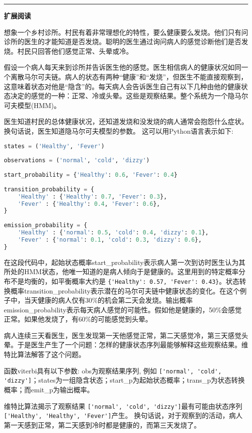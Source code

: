 \documentclass[11pt,a4paper,twoside]{book}
\begin{document}
\vspace{0.5cm}
\hrule height 3pt

\noindent
{\large \bfseries \HandPencilLeft 扩展阅读}

{\small
想象一个乡村诊所。村民有着非常理想化的特性，要么健康要么发烧。他们只有问诊所的医生的才能知道是否发烧。聪明的医生通过询问病人的感觉诊断他们是否发烧。村民只回答他们感觉正常、头晕或冷。

假设一个病人每天来到诊所并告诉医生他的感觉。医生相信病人的健康状况如同一个离散马尔可夫链。病人的状态有两种“健康”和“发烧”，但医生不能直接观察到，这意味着状态对他是“隐含”的。每天病人会告诉医生自己有以下几种由他的健康状态决定的感觉的一种：正常、冷或头晕。这些是观察结果。整个系统为一个隐马尔可夫模型(HMM)。

医生知道村民的总体健康状况，还知道发烧和没发烧的病人通常会抱怨什么症状。换句话说，医生知道隐马尔可夫模型的参数。 这可以用Python语言表示如下:

\begin{lstlisting}[language=python]
states = ('Healthy', 'Fever')
 
observations = ('normal', 'cold', 'dizzy')
 
start_probability = {'Healthy': 0.6, 'Fever': 0.4}
 
transition_probability = {
    'Healthy' : {'Healthy': 0.7, 'Fever': 0.3},
    'Fever' : {'Healthy': 0.4, 'Fever': 0.6},
}
 
emission_probability = {
    'Healthy' : {'normal': 0.5, 'cold': 0.4, 'dizzy': 0.1},
    'Fever' : {'normal': 0.1, 'cold': 0.3, 'dizzy': 0.6},
}
\end{lstlisting}

在这段代码中，起始状态概率start\_probability表示病人第一次到访时医生认为其所处的HMM状态，他唯一知道的是病人倾向于是健康的。这里用到的特定概率分布不是均衡的，如平衡概率大约是
\verb|{'Healthy': 0.57, 'Fever': 0.43}|。状态转换概率transition\_probability表示潜在的马尔可夫链中健康状态的变化。在这个例子中，当天健康的病人仅有30\%的机会第二天会发烧。输出概率emission\_probability表示每天病人感觉的可能性。假如他是健康的，50\%会感觉正常。如果他发烧了，有60\%的可能感觉到头晕。

病人连续三天看医生，医生发现第一天他感觉正常，第二天感觉冷，第三天感觉头晕。于是医生产生了一个问题：怎样的健康状态序列最能够解释这些观察结果。维特比算法解答了这个问题。

函数viterbi具有以下参数: obs为观察结果序列, 例如 \verb|['normal', 'cold', 'dizzy']|；states为一组隐含状态；start\_p为起始状态概率；trans\_p为状态转换概率；而emit\_p为输出概率。

维特比算法揭示了观察结果 \verb|['normal', 'cold', 'dizzy']|最有可能由状态序列 \verb|['Healthy', 'Healthy', 'Fever']|产生。 换句话说，对于观察到的活动，病人第一天感到正常，第二天感到冷时都是健康的，而第三天发烧了。
}
\end{document}
